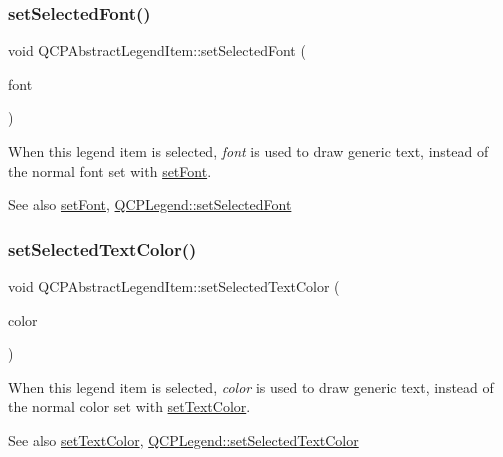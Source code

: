 \subsubsection{\texorpdfstring{set\+Selected\+Font()}{setSelectedFont()}}
{\footnotesize\ttfamily void Q\+C\+P\+Abstract\+Legend\+Item\+::set\+Selected\+Font (\begin{DoxyParamCaption}\item[{const Q\+Font \&}]{font }\end{DoxyParamCaption})}

When this legend item is selected, {\itshape font} is used to draw generic text, instead of the normal font set with \hyperlink{class_q_c_p_abstract_legend_item_a409c53455d8112f71d70c0c43eb10265}{set\+Font}.

\begin{DoxySeeAlso}{See also}
\hyperlink{class_q_c_p_abstract_legend_item_a409c53455d8112f71d70c0c43eb10265}{set\+Font}, \hyperlink{class_q_c_p_legend_ab580a01c3c0a239374ed66c29edf5ad2}{Q\+C\+P\+Legend\+::set\+Selected\+Font} 
\end{DoxySeeAlso}
\mbox{\label{class_q_c_p_abstract_legend_item_a4d01d008ee1a5bfe9905b0397a421936}} 
\subsubsection{\texorpdfstring{set\+Selected\+Text\+Color()}{setSelectedTextColor()}}
{\footnotesize\ttfamily void Q\+C\+P\+Abstract\+Legend\+Item\+::set\+Selected\+Text\+Color (\begin{DoxyParamCaption}\item[{const Q\+Color \&}]{color }\end{DoxyParamCaption})}

When this legend item is selected, {\itshape color} is used to draw generic text, instead of the normal color set with \hyperlink{class_q_c_p_abstract_legend_item_a6ebace6aaffaedcdab2d74e88acc2d1e}{set\+Text\+Color}.

\begin{DoxySeeAlso}{See also}
\hyperlink{class_q_c_p_abstract_legend_item_a6ebace6aaffaedcdab2d74e88acc2d1e}{set\+Text\+Color}, \hyperlink{class_q_c_p_legend_a7674dfc7a1f30e1abd1018c0ed45e0bc}{Q\+C\+P\+Legend\+::set\+Selected\+Text\+Color} 
\end{DoxySeeAlso}
\mbox{\label{class_q_c_p_abstract_legend_item_a6ebace6aaffaedcdab2d74e88acc2d1e}} 
